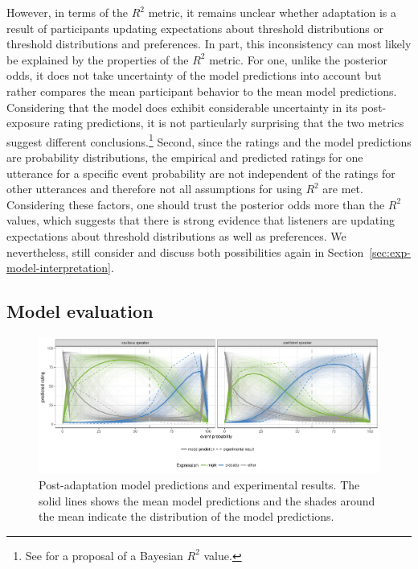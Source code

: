 \documentclass[lucida,biblatex]{sp} %
\newcommand{\sectionref}[1]{Section~\ref{#1}}
\begin{document}
However, in terms of the $R^2$ metric, it remains unclear whether adaptation is a result of 
participants updating expectations about threshold distributions or threshold distributions and preferences. 
In part, this inconsistency can most likely be explained by the properties of the $R^2$ metric. For one, unlike the posterior odds, 
it does not take uncertainty of the model predictions into account but rather compares the mean participant behavior to the mean 
model predictions. Considering that the model does exhibit considerable uncertainty in its post-exposure rating predictions, it is not
particularly surprising that the two metrics suggest different conclusions.\footnote{See \citep{Gelman2018} for a proposal of a Bayesian $R^2$ value.}
Second, since the ratings and the model predictions are probability distributions, 
the empirical and predicted ratings for one utterance for a specific event probability are not independent 
of the ratings for other utterances and therefore not all assumptions for using $R^2$ are met. Considering these
factors, one should trust the posterior odds more than the $R^2$ values, which suggests that there is strong evidence that listeners 
are updating expectations about {threshold distributions} as well as {preferences}. We nevertheless, still consider and discuss both possibilities
again in \sectionref{sec:exp-model-interpretation}.



\subsection{Model evaluation}

\begin{figure}
  \includegraphics[width=\textwidth]{plots/adaptation-posterior-predictions.pdf}
  \caption{Post-adaptation model predictions and experimental results. 
  The solid lines shows the mean model predictions and the shades around the mean indicate the distribution of the model predictions. \label{fig:post-exposure-model}}
\end{figure}
\end{document}

